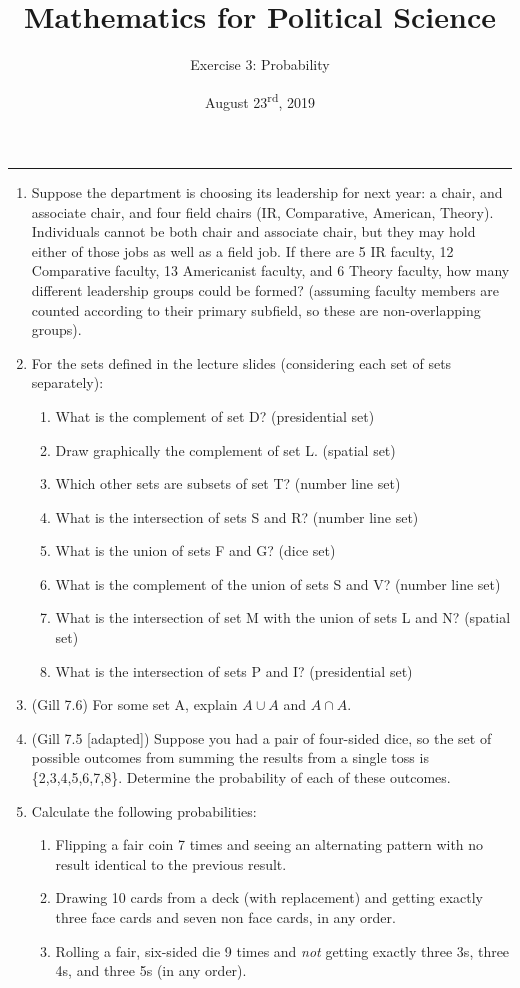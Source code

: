\documentclass[11pt]{article}
\title{\Large{\bf{\vspace{-100pt}Mathematics for Political Science \vspace{-15pt}}}}
\author{\large{Exercise 3: Probability}}
\date{August 23\textsuperscript{rd}, 2019}
\begin{document}
\maketitle

\hrule

\begin{enumerate}

\item Suppose the department is choosing its leadership for next year: a chair, and associate chair, and four field chairs (IR, Comparative, American, Theory).  Individuals cannot be both chair and associate chair, but they may hold either of those jobs as well as a field job.  If there are 5 IR faculty, 12 Comparative faculty, 13 Americanist faculty, and 6 Theory faculty, how many different leadership groups could be formed? (assuming faculty members are counted according to their primary subfield, so these are non-overlapping groups).


\item For the sets defined in the lecture slides (considering each set of sets separately):
\begin{enumerate}
\item What is the complement of set D? (presidential set)
\item Draw graphically the complement of set L. (spatial set)
\item Which other sets are subsets of set T? (number line set)
\item What is the intersection of sets S and R? (number line set)
\item What is the union of sets F and G? (dice set)
\item What is the complement of the union of sets S and V? (number line set)
\item What is the intersection of set M with the union of sets L and N? (spatial set)
\item What is the intersection of sets P and I? (presidential set)
\end{enumerate}


\item (Gill 7.6) For some set A, explain $A \cup A$ and $A \cap A$.


\item (Gill 7.5 [adapted]) Suppose you had a pair of four-sided dice, so the set of possible outcomes from summing the results from a single toss is \{2,3,4,5,6,7,8\}.  Determine the probability of each of these outcomes.


\item Calculate the following probabilities:
\begin{enumerate}
\item Flipping a fair coin 7 times and seeing an alternating pattern with no result identical to the previous result. 
\item Drawing 10 cards from a deck (with replacement) and getting exactly three face cards and seven non face cards, in any order.
\item Rolling a fair, six-sided die 9 times and \textit{not} getting exactly three 3s, three 4s, and three 5s (in any order).
\end{enumerate}



\end{enumerate}
\end{document}
